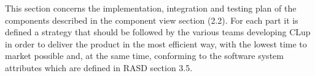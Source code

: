 \documentclass[../../main.tex]{subfiles}
\begin{document}
This section concerns the implementation, integration and testing plan of the components described in the component view section (2.2).
For each part it is defined a strategy that should be followed by the various teams developing CLup in order to deliver the product in 
the most efficient way, with the lowest time to market possible and, at the same time, conforming to the software system attributes which 
are defined in RASD section 3.5.
\end{document}
